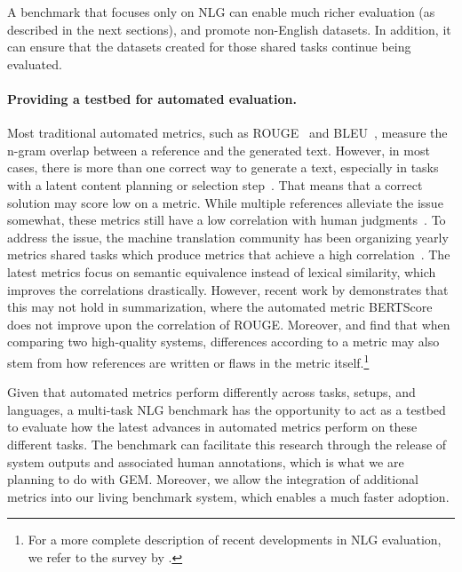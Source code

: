 \documentclass[11pt,a4paper]{article}
\newcommand{\GEM}{\textsc{GEM}}
\begin{document}
A benchmark that focuses only on NLG can enable much richer evaluation (as described in the next sections), and promote non-English datasets. In addition, it can ensure that the datasets created for those shared tasks continue being evaluated. 

\paragraph{Providing a testbed for automated evaluation.} 

Most traditional automated metrics, such as ROUGE~\citep{lin2004rouge} and BLEU~\citep{papineni2002bleu}, measure the n-gram overlap between a reference and the generated text. However, in most cases, there is more than one correct way to generate a text, especially in tasks with a latent content planning or selection step~\citep{reiter2000building}. That means that a correct solution may score low on a metric. While multiple references alleviate the issue somewhat, these metrics still have a low correlation with human judgments~\citep{reiter2018structured, fabbri2020summeval}. 
To address the issue, the machine translation community has been organizing yearly metrics shared tasks which produce metrics that achieve a high correlation~\citep{stanojevic2015results,bojar2016results,bojar2017results,ma2018results,ma2019results,mathur2020results}. The latest metrics focus on semantic equivalence instead of lexical similarity, which improves the correlations drastically. However, recent work by \citet{fabbri2020summeval} demonstrates that this may not hold in summarization, where the automated metric BERTScore~\citep{zhang2019bertscore} does not improve upon the correlation of ROUGE. Moreover, \citet{mathur-2020-tangled} and \citet{freitag-2020-bleu} find that when comparing two high-quality systems, differences according to a metric may also stem from how references are written or flaws in the metric itself.\footnote{For a more complete description of recent developments in NLG evaluation, we refer to the survey by \citet{celikyilmaz2020evaluation}.}

Given that automated metrics perform differently across tasks, setups, and languages, a multi-task NLG benchmark has the opportunity to act as a testbed to evaluate how the latest advances in automated metrics perform on these different tasks. The benchmark can facilitate this research through the release of system outputs and associated human annotations, which is what we are planning to do with \GEM. Moreover, we allow the integration of additional metrics into our living benchmark system, which enables a much faster adoption.  
\end{document}
